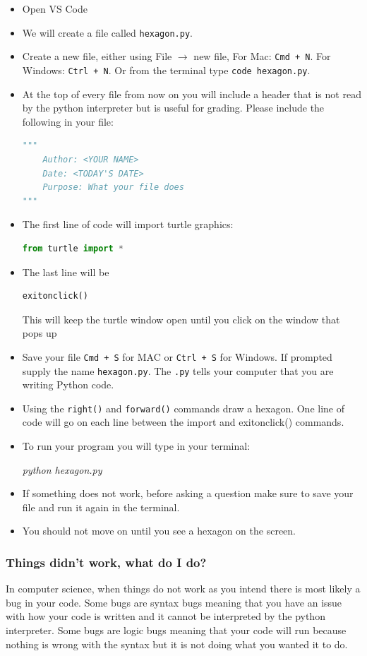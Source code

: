 \documentclass[12pt]{article}
\begin{document}
\begin{itemize}
\item Open VS Code
  \item We will create a file called \texttt{hexagon.py}. 
  \item Create a new file, either using File $\rightarrow$ new file, For Mac: \texttt{Cmd + N}. For Windows: \texttt{Ctrl + N}. Or from the terminal type \texttt{code hexagon.py}.
  \item At the top of every file from now on you will include a header that is not read by the python interpreter but is useful for grading. Please include the following in your file:
\begin{lstlisting}[language=Python]
"""
    Author: <YOUR NAME>
    Date: <TODAY'S DATE>    
    Purpose: What your file does
"""\end{lstlisting}
\item The first line of code will import turtle graphics:
  \begin{lstlisting}[language=Python]
from turtle import * \end{lstlisting}
\item The last line will be
    \begin{lstlisting}[language=Python]
exitonclick() \end{lstlisting}
    This will keep the turtle window open until you click on the window that pops up
  \item Save your file \texttt{Cmd + S} for MAC or \texttt{Ctrl + S} for Windows. If prompted supply the name \texttt{hexagon.py}. The \texttt{.py} tells your computer that you are writing Python code. 
  \item Using the \texttt{right()} and \texttt{forward()} commands draw a hexagon. One line of code will go on each line between the import and exitonclick() commands.
  \item To run your program you will type in your terminal:

    \vspace{5mm}
    \textit{python hexagon.py}
    \vspace{5mm}

  \item If something does not work, before asking a question make sure to save your file and run it again in the terminal.
  \item You should not move on until you see a hexagon on the screen.
\end{itemize}

\subsubsection{Things didn't work, what do I do?}
In computer science, when things do not work as you intend there is most likely a bug in your code.
Some bugs are syntax bugs meaning that you have an issue with how your code is written and it cannot be interpreted by the python interpreter.
Some bugs are logic bugs meaning that your code will run because nothing is wrong with the syntax but it is not doing what you wanted it to do.
\end{document}
